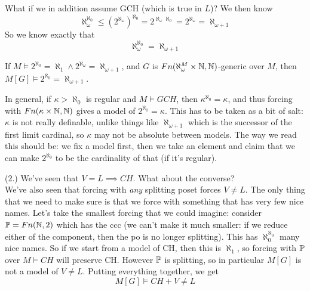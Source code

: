 \documentclass[a4paper]{article}
\begin{document}
What if we in addition assume GCH (which is true in $L$)? We then know
\[
\aleph_\omega^{\aleph_0} \leq (2^{\aleph_\omega})^{\aleph_0} = 2^{\aleph_\omega \aleph_0} = 2^{\aleph_\omega} = \aleph_{\omega+1}
\]
So we know exactly that
\[
\aleph_\omega^{\aleph_0} = \aleph_{\omega+1}
\]
\begin{coro}
If $M \vDash 2^{\aleph_0} = \aleph_1 \wedge 2^{\aleph_\omega} = \aleph_{\omega+1}$, and $G$ is $Fn(\aleph_\omega^M \times \N, \N)$-generic over $M$, then $M[G] \vDash 2^{\aleph_0} = \aleph_{\omega+1}$.
\end{coro}
In general, if $\kappa > \aleph_0$ is regular and $M \vDash GCH$, then $\kappa^{\aleph_0} = \kappa$, and thus forcing with $Fn(\kappa \times \N, \N)$ gives a model of $2^{\aleph_0} = \kappa$. This has to be taken as a bit of salt: $\kappa$ is not really definable, unlike things like $\aleph_{\omega+1}$ which is the successor of the first limit cardinal, so $\kappa$ may not be absolute between models. The way we read this should be: we fix a model first, then we take an element and claim that we can make $2^{\aleph_0}$ to be the cardinality of that (if it's regular).

(2.) We've seen that $V=L \implies CH$. What about the converse?\\
We've also seen that forcing with \emph{any} splitting poset forces $V \neq L$. The only thing that we need to make sure is that we force with something that has very few nice names. Let's take the smallest forcing that we could imagine: consider $\P = Fn(\N,2)$ which has the ccc (we can't make it much smaller: if we reduce either of the component, then the po is no longer splitting). This has $\aleph_0^{\aleph_0}$ many nice names. So if we start from a model of CH, then this is $\aleph_1$, so forcing with $\P$ over $M \vDash CH$ will preserve CH. However $\P$ is splitting, so in particular $M[G]$ is not a model of $V\neq L$. Putting everything together, we get
\[
M[G] \vDash CH + V \neq L
\]
\end{document}
